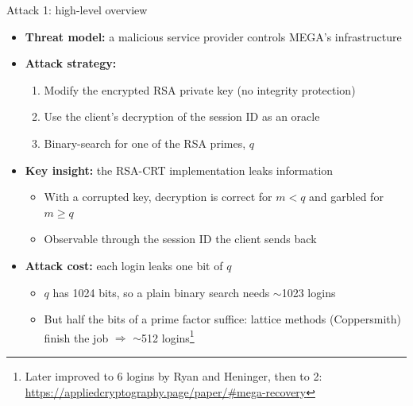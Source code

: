 \ifdefined\PRESENTATION\else\PassOptionsToClass{handout}{beamer}\fi\documentclass[aspectratio=169, lualatex]{beamer}
\begin{document}
\begin{frame}{Attack 1: high-level overview}
	\begin{itemize}
		\item \textbf{Threat model:} a malicious service provider controls MEGA's infrastructure
		\item \textbf{Attack strategy:}
		      \begin{enumerate}
			      \item Modify the encrypted RSA private key (no integrity protection)
			      \item Use the client's decryption of the session ID as an oracle
			      \item Binary-search for one of the RSA primes, $q$
		      \end{enumerate}
		\item \textbf{Key insight:} the RSA-CRT implementation leaks information
		      \begin{itemize}
			      \item With a corrupted key, decryption is correct for $m < q$ and garbled for $m \geq q$
			      \item Observable through the session ID the client sends back
		      \end{itemize}
		\item \textbf{Attack cost:} each login leaks one bit of $q$
		      \begin{itemize}
			      \item $q$ has 1024 bits, so a plain binary search needs ${\sim}$1023 logins
			      \item But half the bits of a prime factor suffice: lattice methods (Coppersmith) finish the job $\Rightarrow$ ${\sim}$512 logins\footnote{Later improved to 6 logins by Ryan and Heninger, then to 2: \url{https://appliedcryptography.page/paper/\#mega-recovery}}
		      \end{itemize}
	\end{itemize}
\end{frame}
\end{document}
